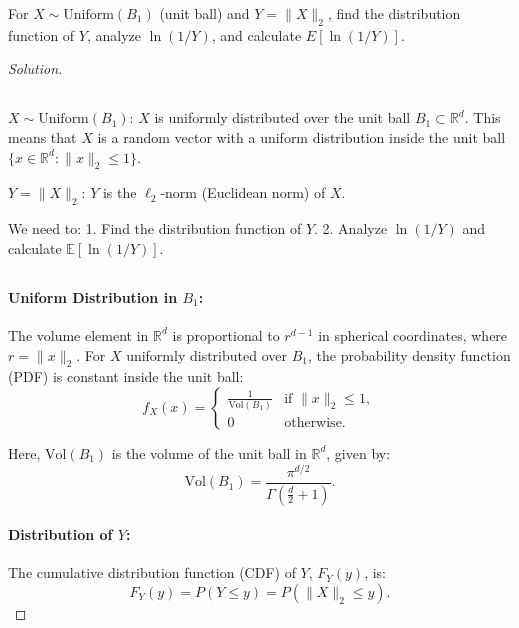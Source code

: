 \documentclass[12pt]{article}
\newenvironment{exercise}[2][Exercise]{\begin{trivlist}
\item[\hskip \labelsep {\bfseries #1}\hskip \labelsep {\bfseries #2.}]}{\end{trivlist}}
\newenvironment{solution}{\begin{proof}[Solution]}{\end{proof}}
\begin{document}
\newpage

\begin{exercise}{5}
For $X \sim \text{Uniform}(B_1)$ (unit ball) and $Y = \|X\|_2$, find the distribution function of $Y$, analyze $\ln(1/Y)$, and calculate $E[\ln(1/Y)]$.
\end{exercise}

\begin{solution}

\subsection*{}
\( X \sim \text{Uniform}(B_1) \): \( X \) is uniformly distributed over the unit ball \( B_1 \subset \mathbb{R}^d \). This means that \( X \) is a random vector with a uniform distribution inside the unit ball \( \{x \in \mathbb{R}^d : \|x\|_2 \leq 1\} \).

\( Y = \|X\|_2 \): \( Y \) is the \( \ell_2 \)-norm (Euclidean norm) of \( X \).

We need to:
1. Find the distribution function of \( Y \).
2. Analyze \( \ln(1 / Y) \) and calculate \( \mathbb{E}[\ln(1 / Y)] \).

\subsection*{}
\paragraph{Uniform Distribution in \( B_1 \):}
The volume element in \( \mathbb{R}^d \) is proportional to \( r^{d-1} \) in spherical coordinates, where \( r = \|x\|_2 \). For \( X \) uniformly distributed over \( B_1 \), the probability density function (PDF) is constant inside the unit ball:
\[
f_X(x) = 
\begin{cases} 
\frac{1}{\text{Vol}(B_1)} & \text{if } \|x\|_2 \leq 1, \\
0 & \text{otherwise}.
\end{cases}
\]

Here, \( \text{Vol}(B_1) \) is the volume of the unit ball in \( \mathbb{R}^d \), given by:
\[
\text{Vol}(B_1) = \frac{\pi^{d/2}}{\Gamma\left(\frac{d}{2} + 1\right)}.
\]

\paragraph{Distribution of \( Y \):}
The cumulative distribution function (CDF) of \( Y \), \( F_Y(y) \), is:
\[
F_Y(y) = P(Y \leq y) = P(\|X\|_2 \leq y).
\]


\end{solution}
\end{document}
